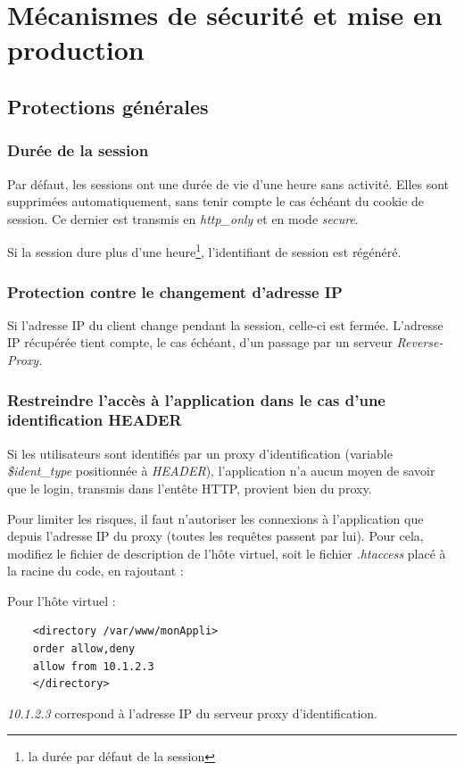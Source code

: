 \chapter{Mécanismes de sécurité et mise en production}

\section{Protections générales}
\subsection{Durée de la session}
Par défaut, les sessions ont une durée de vie d'une heure sans activité. Elles sont supprimées automatiquement, sans tenir compte le cas échéant du cookie de session. Ce dernier est transmis en \textit{http\_only} et en mode \textit{secure}.

Si la session dure plus d'une heure\footnote{la durée par défaut de la session}, l'identifiant de session est régénéré.

\subsection{Protection contre le changement d'adresse IP}

Si l'adresse IP du client change pendant la session, celle-ci est fermée. L'adresse IP récupérée tient compte, le cas échéant, d'un passage par un serveur \textit{Reverse-Proxy}.

\subsection{Restreindre l'accès à l'application dans le cas d'une identification HEADER}

Si les utilisateurs sont identifiés par un proxy d'identification (variable \textit{\$ident\_type} positionnée à \textit{HEADER}), l'application n'a aucun moyen de savoir que le login, transmis dans l'entête HTTP, provient bien du proxy.

Pour limiter les risques, il faut n'autoriser les connexions à l'application que depuis l'adresse IP du proxy (toutes les requêtes passent par lui). Pour cela, modifiez le fichier de description de l'hôte virtuel, soit le fichier \textit{.htaccess} placé à la racine du code, en rajoutant :

Pour l'hôte virtuel :
\begin{lstlisting}
    <directory /var/www/monAppli>
    order allow,deny
    allow from 10.1.2.3
    </directory>
\end{lstlisting} 
\textit{10.1.2.3} correspond à l'adresse IP du serveur proxy d'identification.

